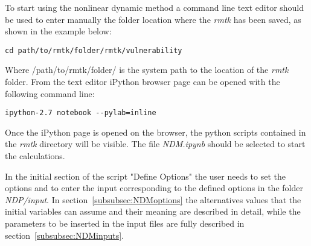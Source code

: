 To start using the nonlinear dynamic method a command line text editor should be used to enter manually the folder location where the \textit{rmtk} has been saved, as shown in the example below:

\begin{Verbatim}[frame=single, commandchars=\\\{\}, samepage=true]
cd path/to/rmtk/folder/rmtk/vulnerability
\end{Verbatim}

Where /path/to/rmtk/folder/ is the system path to the location of the \textit{rmtk} folder. From the text editor iPython browser page can be opened with the following command line:

\begin{Verbatim}[frame=single, commandchars=\\\{\}, samepage=true]
ipython-2.7 notebook --pylab=inline
\end{Verbatim}

Once the iPython page is opened on the browser, the python scripts contained in the \textit{rmtk} directory will be visible. The file \textit{NDM.ipynb} should be selected to start the calculations.

In the initial section of the script "Define Options" the user needs to set the options and to enter the input corresponding to the defined options in the folder \textit{NDP/input}. In section~\ref{subsubsec:NDMoptions} the alternatives values that the initial variables can assume and their meaning are described in detail, while the parameters to be inserted in the input files are fully described in section~\ref{subsubsec:NDMinputs}.